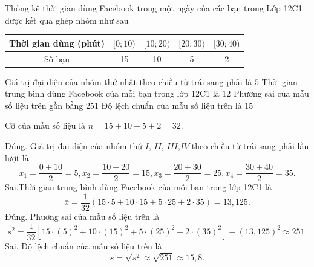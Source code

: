 \begin{ex}%
Thống kê thời gian dùng Facebook trong một ngày của các bạn trong Lớp 12C1 được kết quả ghép nhóm như sau
\begin{center}
\begin{tabular}{|c|c|c|c|c|}
\hline Thời gian dùng (phút) & {$[0 ; 10)$} & {$[10 ; 20)$} & {$[20 ; 30)$} & {$[30 ; 40)$} \\
\hline Số bạn & 15 & 10 & 5 & 2 \\
\hline
\end{tabular}
\end{center}
\choiceTF
{\True Giá trị đại diện của nhóm thứ nhất theo chiều từ trái sang phải là $5$}
{Thời gian trung bình dùng Facebook của mỗi bạn trong lớp 12C1 là $12$}
{\True Phương sai của mẫu số liệu trên gần bằng $251$}
{Độ lệch chuẩn của mẫu số liệu trên là $15$}
\loigiai
{
Cỡ của mẫu số liệu là $n=15+10+5+2=32$.
\begin{itemchoice}
\itemch Đúng. Giá trị đại diện của nhóm thứ $I$, $II$, $III$,$IV$ theo chiều từ trái sang phải lần lượt là 
$$x_1=\dfrac{0+10}{2}=5,x_2=\dfrac{10+20}{2}=15, x_3=\dfrac{20+30}{2}=25, x_4=\dfrac{30+40}{2}=35.$$
\itemch  Sai.Thời gian trung bình dùng Facebook của mỗi bạn trong lớp 12C1 là
$$\bar{x}=\dfrac{1}{32}(15\cdot 5+10\cdot 15+5\cdot 25+2\cdot 35)=13{,}125.$$
\itemch  Đúng. Phương sai của mẫu số liệu trên là
$$s^2=\dfrac{1}{32}\left[15\cdot (5)^2+10\cdot (15)^2+5\cdot (25)^2+2\cdot (35)^2\right]-(13{,}125)^2 \approx 251.$$
\itemch Sai. Độ lệch chuẩn của mẫu số liệu trên là
$$s=\sqrt{s^2} \approx \sqrt{251} \approx 15{,}8.$$
\end{itemchoice}
}
\end{ex}

